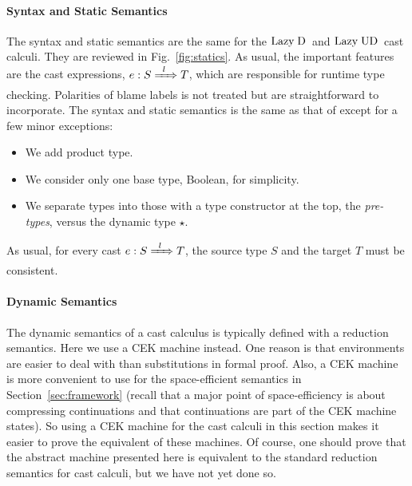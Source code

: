 \documentclass[runningheads]{llncs}
\newcommand{\figref}[1]{Fig.~\ref{#1}}
\newcommand{\chapref}[1]{Section~\ref{#1}}
\newcommand{\LUD}{\ensuremath{\text{Lazy\;UD}}}
\newcommand{\LD}{\ensuremath{\text{Lazy\;D}}}
\newcommand{\Tdyn}[0]{\ensuremath{\star}}
\newcommand{\ecast}[2]{\ensuremath{#1 : #2}}
\newcommand{\ccast}[3]{#1 \xRightarrow[]{\enskip #2 \enskip} #3}
\begin{document}
\paragraph{Syntax and Static Semantics}

The syntax and static semantics are the same for the \LD\ and
\LUD\ cast calculi. They are reviewed in \figref{fig:statics}.
As usual, the important features are the cast expressions,
$\ecast{e}{\ccast{S}{l}{T}}$, which are responsible for runtime type
checking. Polarities of blame labels is not treated but are straightforward to 
incorporate. The syntax and static semantics is the same as that of 
\citep{siek2009exploring} except for a few minor exceptions:

\begin{itemize}
\item We add product type.
\item We consider only one base type, Boolean, for simplicity.
\item We separate types into those with a type constructor at the top,
  the \emph{pre-types}, versus the dynamic type \Tdyn.
\end{itemize}
As usual, for every cast $\ecast{e}{\ccast{S}{l}{T}}$, the source type $S$ and 
the target $T$ must be consistent.

\paragraph{Dynamic Semantics}

The dynamic semantics of a cast calculus is typically defined with a
reduction semantics. Here we use a CEK machine
\citep{felleisen1986control} instead. One reason is that environments are 
easier 
to deal with than substitutions in formal proof. Also, a CEK machine is more
convenient to use for the space-efficient semantics in
\chapref{sec:framework} (recall that a major point of space-efficiency 
is about compressing continuations and that continuations are part of the CEK 
machine states). So using a CEK machine for the cast 
calculi in this section makes it easier to prove the equivalent of these 
machines. Of course, one should prove that the abstract machine
presented here is equivalent to the standard reduction semantics for
cast calculi, but we have not yet done so.
\end{document}
